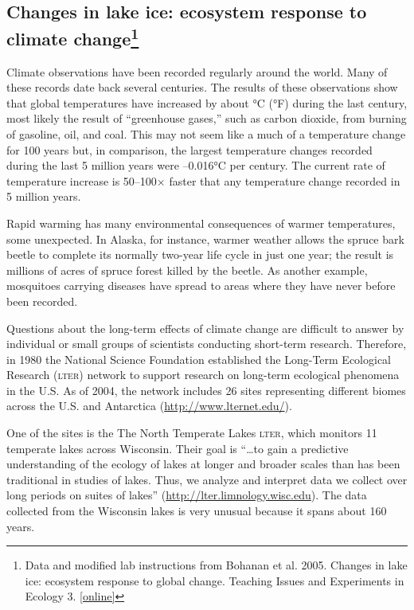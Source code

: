 \documentclass[12pt, hidelinks]{exam}
\begin{document}
\subsection*{Changes in lake ice: ecosystem response to climate
change\footnote{\raggedright Data and modified lab instructions from Bohanan et al. 2005. Changes in lake ice: ecosystem response to global change. Teaching Issues and Experiments in Ecology 3. \href{http://www.esa.org/tiee/vol/v3/issues/data_sets/lake_ice/abstract.html}{[online]}}}

Climate observations have been recorded regularly around the world. Many of
these records date back several centuries. The results of these observations
show that global temperatures
have increased by about {}°C ({}°F) during the last century,
most likely the result of ``greenhouse gases,'' such as carbon dioxide,
from burning of gasoline, oil, and coal. This may not seem like a
much of a temperature change for 100 years but, in comparison, 
the largest temperature changes recorded during the last 5 million years were 
{–0.016}°C per century. The current rate of temperature increase is 
50–100$\times$ faster that any temperature change recorded in 5 million years.

Rapid warming has many environmental consequences of warmer temperatures, some
unexpected. In Alaska, for instance, warmer weather allows the spruce
bark beetle to complete its normally two-year life cycle in just one
year; the result is millions of acres of spruce forest killed by the
beetle. As another example, mosquitoes carrying diseases have spread to
areas where they have never before been recorded.


Questions about the long-term effects of climate change are difficult
to answer by individual or small groups of scientists conducting
short-term research. Therefore, in 1980 the National Science Foundation
established the Long-Term Ecological Research (\textsc{lter}) network to support
research on long-term ecological phenomena in the U.S. 
As of 2004, the network includes 26 sites representing different biomes across the
U.S. and Antarctica (\url{http://www.lternet.edu/}).

One of the sites is the The North Temperate Lakes \textsc{lter},
which monitors 11 temperate lakes across Wisconsin. Their goal  is “\dots to gain a
predictive understanding of the ecology of lakes at longer and broader
scales than has been traditional in studies of lakes. Thus, we analyze and
interpret data we collect over long periods on suites of lakes”
(\url{http://lter.limnology.wisc.edu}). The data collected
from the Wisconsin lakes is very unusual
because it spans about 160 years.
\end{document}
